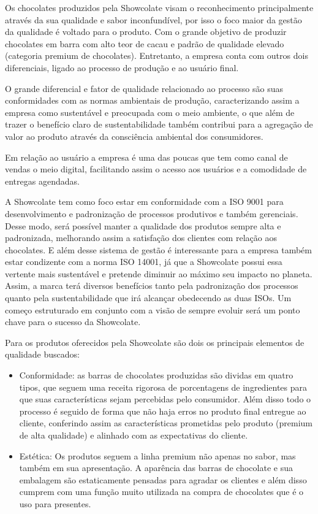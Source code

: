\documentclass[
	12pt,				%
	openright,			%
	oneside,			%
	a4paper,			%
	english,			%
	french,				%
	spanish,			%
	brazil				%
	]{abntex2}
\begin{document}
Os chocolates produzidos pela Showcolate visam o reconhecimento principalmente através da sua qualidade e sabor inconfundível, por isso o foco maior da gestão da qualidade é voltado para o produto. Com o grande objetivo de produzir chocolates em barra com alto teor de cacau e padrão de qualidade elevado (categoria premium de chocolates). Entretanto, a empresa conta com outros dois diferenciais, ligado ao processo de produção e ao usuário final.

O grande diferencial e fator de qualidade relacionado ao processo são suas conformidades com as normas ambientais de produção, caracterizando assim a empresa como sustentável e preocupada com o meio ambiente, o que além de trazer o benefício claro de sustentabilidade também contribui para a agregação de valor ao produto através da consciência ambiental dos consumidores.

Em relação ao usuário a empresa é uma das poucas que tem como canal de vendas o meio digital, facilitando assim o acesso aos usuários e a comodidade de entregas agendadas.

A Showcolate tem como foco estar em conformidade com a ISO 9001 para desenvolvimento e padronização de processos produtivos e também gerenciais. Desse modo, será possível manter a qualidade dos produtos sempre alta e padronizada, melhorando assim a satisfação dos clientes com relação aos chocolates. E além desse sistema de gestão é interessante para a empresa também estar condizente com a norma ISO 14001, já que a Showcolate possui essa vertente mais sustentável e pretende diminuir ao máximo seu impacto no planeta. Assim, a marca terá diversos benefícios tanto pela padronização dos processos quanto pela sustentabilidade que irá alcançar obedecendo as duas ISOs. Um começo estruturado em conjunto com a visão de sempre evoluir será um ponto chave para o sucesso da Showcolate.


Para os produtos oferecidos pela Showcolate são dois os principais elementos de qualidade buscados:

\begin{itemize}
\item Conformidade: as barras de chocolates produzidas são dividas em quatro tipos, que seguem uma receita rigorosa de porcentagens de ingredientes para que suas características sejam percebidas pelo consumidor. Além disso todo o processo é seguido de forma que não haja erros no produto final entregue ao cliente, conferindo assim as características prometidas pelo produto (premium de alta qualidade) e alinhado com as expectativas do cliente.
\item Estética: Os produtos seguem a linha premium não apenas no sabor, mas também em sua apresentação. A aparência das barras de chocolate e sua embalagem são estaticamente pensadas para agradar os clientes e além disso cumprem com uma função muito utilizada na compra de chocolates que é o uso para presentes.
\end{itemize}
\end{document}
